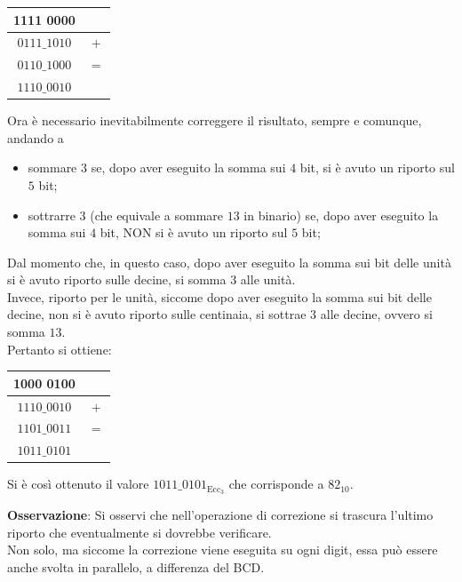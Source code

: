 \documentclass[a4paper]{extarticle}
\renewcommand\arraystretch{}
\begin{document}
\noindent
\begin{table}[H]
\setlength{\tabcolsep}{4pt}
\renewcommand{\arraystretch}{1.2}
\centering
\begin{tabular}{cc}
    1111 0000 & \\
    \hline
    $0111\_1010$ & $+$\\
    \hline
    $0110\_1000$ & $=$\\
    \hline
    $1110\_0010$ & \\
\end{tabular}
\end{table}

\vspace{1em}
\noindent
Ora è necessario inevitabilmente correggere il risultato, sempre e comunque, andando a
\begin{itemize}
    \item sommare $3$ se, dopo aver eseguito la somma sui $4$ bit, si è avuto un riporto sul $5$ bit;
    \item sottrarre $3$ (che equivale a sommare $13$ in binario) se, dopo aver eseguito la somma sui $4$ bit, NON si è avuto un riporto sul $5$ bit;
\end{itemize}
Dal momento che, in questo caso, dopo aver eseguito la somma sui bit delle unità si è avuto riporto sulle decine, si somma $3$ alle unità.\\
Invece, riporto per le unità, siccome dopo aver eseguito la somma sui bit delle decine, non si è avuto riporto sulle centinaia, si sottrae $3$ alle decine, ovvero si somma $13$.\\
Pertanto si ottiene:

\noindent
\begin{table}[H]
\setlength{\tabcolsep}{4pt}
\renewcommand{\arraystretch}{1.2}
\centering
\begin{tabular}{cc}
    1000 0100 & \\
    \hline
    $1110\_0010$ & $+$\\
    \hline
    $1101\_0011$ & $=$\\
    \hline
    $1011\_0101$ & \\
\end{tabular}
\end{table}

\vspace{1em}
\noindent
Si è così ottenuto il valore $1011\_0101_{\text{Ecc}_3}$ che corrisponde a $82_{10}$.

\vspace{1em}
\noindent
\textbf{Osservazione}: Si osservi che nell'operazione di correzione si trascura l'ultimo riporto che eventualmente si dovrebbe verificare.\\
Non solo, ma siccome la correzione viene eseguita su ogni digit, essa può essere anche svolta in parallelo, a differenza del BCD.
\end{document}
